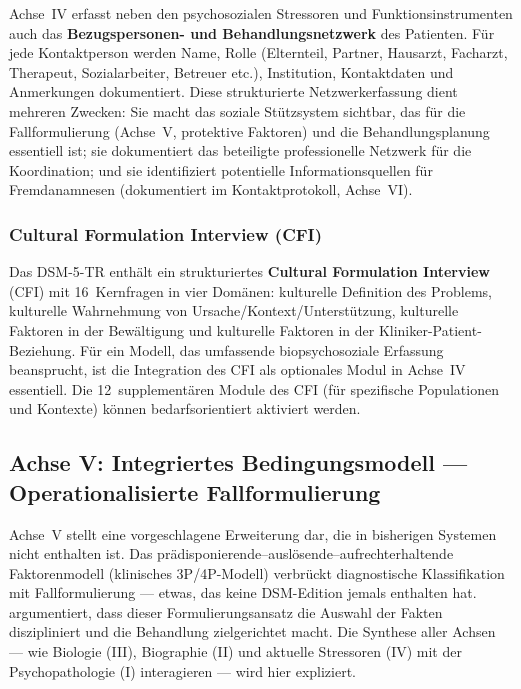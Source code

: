\documentclass[11pt,a4paper]{article}
\begin{document}
Achse~IV erfasst neben den psychosozialen Stressoren und Funktionsinstrumenten auch das \textbf{Bezugspersonen- und Behandlungsnetzwerk} des Patienten. F\"ur jede Kontaktperson werden Name, Rolle (Elternteil, Partner, Hausarzt, Facharzt, Therapeut, Sozialarbeiter, Betreuer etc.), Institution, Kontaktdaten und Anmerkungen dokumentiert. Diese strukturierte Netzwerkerfassung dient mehreren Zwecken: Sie macht das soziale St\"utzsystem sichtbar, das f\"ur die Fallformulierung (Achse~V, protektive Faktoren) und die Behandlungsplanung essentiell ist; sie dokumentiert das beteiligte professionelle Netzwerk f\"ur die Koordination; und sie identifiziert potentielle Informationsquellen f\"ur Fremdanamnesen (dokumentiert im Kontaktprotokoll, Achse~VI).

\subsubsection{Cultural Formulation Interview (CFI)}

Das DSM-5-TR enth\"alt ein strukturiertes \textbf{Cultural Formulation Interview} (CFI) mit 16~Kernfragen in vier Dom\"anen: kulturelle Definition des Problems, kulturelle Wahrnehmung von Ursache/Kontext/Unterst\"utzung, kulturelle Faktoren in der Bew\"altigung und kulturelle Faktoren in der Kliniker-Patient-Beziehung. F\"ur ein Modell, das umfassende biopsychosoziale Erfassung beansprucht, ist die Integration des CFI als optionales Modul in Achse~IV essentiell. Die 12~supplement\"aren Module des CFI (f\"ur spezifische Populationen und Kontexte) k\"onnen bedarfsorientiert aktiviert werden.

\subsection{Achse V: Integriertes Bedingungsmodell --- Operationalisierte Fallformulierung}
\label{sec:achse5}

Achse~V stellt eine vorgeschlagene Erweiterung dar, die in bisherigen Systemen nicht enthalten ist. Das pr\"adisponierende--ausl\"osende--aufrechterhaltende Faktorenmodell (klinisches 3P/4P-Modell) verbr\"uckt diagnostische Klassifikation mit Fallformulierung --- etwas, das keine DSM-Edition jemals enthalten hat. \citet{Owen2023} argumentiert, dass dieser Formulierungsansatz \glqq die Auswahl der Fakten diszipliniert und die Behandlung zielgerichtet macht\grqq{}. Die Synthese aller Achsen --- wie Biologie (III), Biographie (II) und aktuelle Stressoren (IV) mit der Psychopathologie (I) interagieren --- wird hier expliziert.
\end{document}

